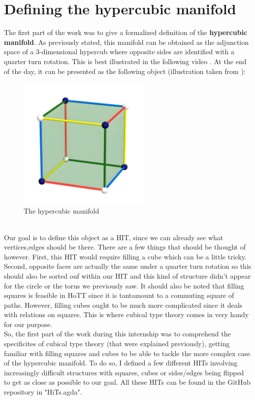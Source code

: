 \documentclass{report}
\begin{document}
\section{Defining the hypercubic manifold}
The first part of the work was to give a formalized definition of the \textbf{hypercubic manifold}. As previously stated, this manifold can be obtained as the adjunction space of a 3-dimensional hypercub where opposite sides are identified with a quarter turn rotation. This is best illustrated in the following video \cite{VHvideo}. At the end of the day, it can be presented as the following object (illustration taken from \cite{hypercubic}):
\begin{figure}[h]
  \begin{center}
    \includegraphics[height= 6.5cm]{cube-3-2.png}
    \caption{The hypercubic manifold}
    \label{fig:H1M}
  \end{center}
\end{figure}\\
Our goal is to define this object as a HIT, since we can already see what vertices,edges should be there. There are a few things that should be thought of however. First, this HIT would require filling a cube which can be a little tricky. Second, opposite faces are actually the same under a quarter turn rotation so this should also be sorted ouf within our HIT and this kind of structure didn't appear for the circle or the torus we previously saw. It should also be noted that filling squares is feasible in HoTT since it is tantamount to a commuting square of paths. However, filling cubes ought to be much more complicated since it deals with relations on squares. This is where cubical type theory comes in very handy for our purpose.\\
So, the first part of the work during this internship was to comprehend the specificites of cubical type theory (that were explained previously), getting familiar with filling squares and cubes to be able to tackle the more complex case of the hypercubic manifold. To do so, I defined a few different HITs involving increasingly difficult structures with squares, cubes or sides/edges being flipped to get as close as possible to our goal. All these HITs can be found in the GitHub repository \cite{repo} in "HiTs.agda". 
\end{document}
